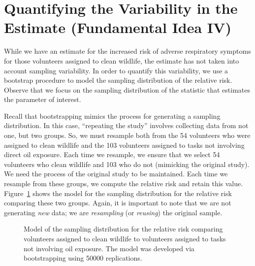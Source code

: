 \documentclass[
  letterpaper,
  DIV=11,
  numbers=noendperiod]{scrreprt}
\theoremstyle{plain}
\theoremstyle{definition}
\theoremstyle{definition}
\theoremstyle{remark}
\begin{document}
\section{Quantifying the Variability in the Estimate (Fundamental Idea
IV)}\label{quantifying-the-variability-in-the-estimate-fundamental-idea-iv}

While we have an estimate for the increased risk of adverse respiratory
symptoms for those volunteers assigned to clean wildlife, the estimate
has not taken into account sampling variability. In order to quantify
this variability, we use a bootstrap procedure to model the sampling
distribution of the relative risk. Observe that we focus on the sampling
distribution of the statistic that estimates the parameter of interest.

Recall that bootstrapping mimics the process for generating a sampling
distribution. In this case, ``repeating the study'' involves collecting
data from not one, but two groups. So, we must resample both from the 54
volunteers who were assigned to clean wildlife and the 103 volunteers
assigned to tasks not involving direct oil exposure. Each time we
resample, we ensure that we select 54 volunteers who clean wildlife and
103 who do not (mimicking the original study). We need the process of
the original study to be maintained. Each time we resample from these
groups, we compute the relative risk and retain this value.
Figure~\ref{fig-recaplanguage-sampling-distribution} shows the model for
the sampling distribution for the relative risk comparing these two
groups. Again, it is important to note that we are not generating
\emph{new} data; we are \emph{resampling} (or \emph{reusing}) the
original sample.

\begin{figure}


\caption{\label{fig-recaplanguage-sampling-distribution}Model of the
sampling distribution for the relative risk comparing volunteers
assigned to clean wildlife to volunteers assigned to tasks not involving
oil exposure. The model was developed via bootstrapping using 50000
replications.}

\end{figure}%
\end{document}
